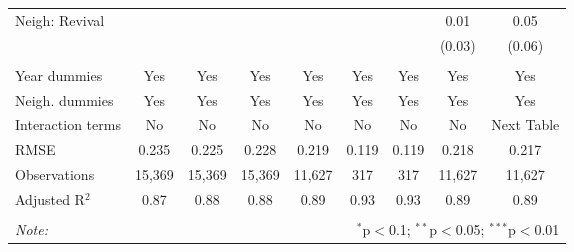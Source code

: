 \begin{table}[!htbp]
\begin{tabular}{@{\extracolsep{5pt}}lcccccccc}
  Neigh: Revival &  &  &  &  &  &  & 0.01 & 0.05 \\ 
  &  &  &  &  &  &  & (0.03) & (0.06) \\ 
 \hline \\[-1.8ex] 
Year dummies & Yes & Yes & Yes & Yes & Yes & Yes & Yes & Yes \\ 
Neigh. dummies & Yes & Yes & Yes & Yes & Yes & Yes & Yes & Yes \\ 
Interaction terms & No & No & No & No & No & No & No & Next Table \\ 
RMSE & 0.235 & 0.225 & 0.228 & 0.219 & 0.119 & 0.119 & 0.218 & 0.217 \\ 
Observations & 15,369 & 15,369 & 15,369 & 11,627 & 317 & 317 & 11,627 & 11,627 \\ 
Adjusted R$^{2}$ & 0.87 & 0.88 & 0.88 & 0.89 & 0.93 & 0.93 & 0.89 & 0.89 \\ 
\hline 
\hline \\[-1.8ex] 
\textit{Note:}  & \multicolumn{8}{r}{$^{*}$p$<$0.1; $^{**}$p$<$0.05; $^{***}$p$<$0.01} \\ 
\end{tabular} 
\end{table} 
